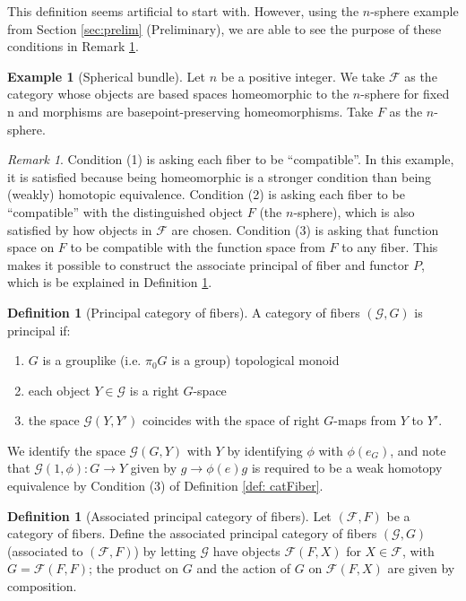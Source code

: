 \documentclass[psamsfonts]{amsart}
\theoremstyle{definition}
\newtheorem{defn}[thm]{Definition}
\newtheorem{exmp}[thm]{Example}
\theoremstyle{remark}
\newtheorem{rem}[thm]{Remark}
\numberwithin{equation}{section}
\begin{document}
This definition seems artificial to start with. However, using the $n$-sphere example from Section \ref{sec:prelim} (Preliminary), we are able to see the purpose of these conditions in Remark \ref{rem:condition}.

\begin{exmp}[Spherical bundle]
Let $n$ be a positive integer. We take $\mathcal{F}$ as the category whose objects are based spaces homeomorphic to the $n$-sphere for fixed n and morphisms are basepoint-preserving homeomorphisms. Take $F$ as the $n$-sphere. 
\end{exmp}

\begin{rem}
\label{rem:condition}
Condition (1) is asking each fiber to be ``compatible''. In this example, it is satisfied because being homeomorphic is a stronger condition than being (weakly) homotopic equivalence. Condition (2) is asking each fiber to be ``compatible'' with the distinguished object $F$ (the $n$-sphere), which is also satisfied by how objects in $\mathcal{F}$ are chosen. Condition (3) is asking that function space on $F$ to be compatible with the function space from $F$ to any fiber. This makes it possible to construct the associate principal of fiber and functor $P$, which is be explained in Definition \ref{def:asso}.
\end{rem}



\begin{defn}[Principal category of fibers]
A category of fibers $(\mathcal{G}, G)$ is principal if: 
\begin{enumerate}
    \item $G$ is a grouplike (i.e. $\pi_{0}G$ is a group) topological monoid
    \item each object $Y \in \mathcal{G}$ is a right $G$-space
    \item the space $\mathcal{G}(Y, Y')$ coincides with the space of right $G$-maps from $Y$ to $Y'$. 
\end{enumerate}
\end{defn}

We identify the space $\mathcal{G}(G, Y)$ with $Y$ by identifying $\phi$  with $\phi(e_{G})$, and note that $\mathcal{G}(1, \phi): G \rightarrow Y$ given by $g \rightarrow \phi(e)g$ is required to be a weak homotopy equivalence by Condition (3) of Definition \ref{def: catFiber}.

\begin{defn}[Associated principal category of fibers]
\label{def:asso}
Let $(\mathcal{F}, F)$ be a category of fibers. Define the associated principal category of fibers $(\mathcal{G}, G)$ (associated to $(\mathcal{F}, F)$) by letting $\mathcal{G}$ have objects $\mathcal{F}(F, X)$ for $X \in \mathcal{F}$, with $G = \mathcal{F}(F, F)$; the product on $G$ and the action of $G$ on $\mathcal{F}(F, X)$ are given by composition. 
\end{defn}
\end{document}
